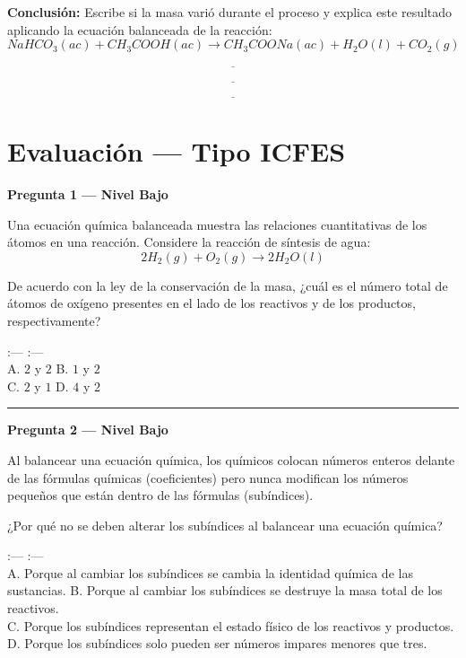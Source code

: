 \documentclass[
  spanish,
  letterpaper,
  12pt,
  oneside,
  open=any]{scrbook}
\newcommand{\setcolorsection}[2]{%
  \definecolor{currentsectionbg}{HTML}{#1}%
  \definecolor{currentsectionborder}{HTML}{#2}%
}
\begin{document}
\textbf{Conclusión:} Escribe si la masa varió durante el proceso y
explica este resultado aplicando la ecuación balanceada de la reacción:
\[NaHCO_3(ac) + CH_3COOH(ac) \rightarrow CH_3COONa(ac) + H_2O(l) + CO_2(g)\]

\[\underline{\hspace{6cm}}\]

\[\underline{\hspace{6cm}}\]

\[\underline{\hspace{6cm}}\]

\setcolorsection{f0c4b8}{dcb0a4}

\section{Evaluación --- Tipo ICFES}\label{evaluaciuxf3n-tipo-icfes-1}

\textbf{Pregunta 1 --- Nivel Bajo}

Una ecuación química balanceada muestra las relaciones cuantitativas de
los átomos en una reacción. Considere la reacción de síntesis de agua:
\[2H_2(g) + O_2(g) \rightarrow 2H_2O(l)\]

De acuerdo con la ley de la conservación de la masa, ¿cuál es el número
total de átomos de oxígeno presentes en el lado de los reactivos y de
los productos, respectivamente?

:--- \textbar{} :--- \textbar{}\\
A. \(2\) y \(2\) \textbar{} B. \(1\) y \(2\) \textbar{}\\
C. \(2\) y \(1\) \textbar{} D. \(4\) y \(2\) \textbar{}

\begin{center}\rule{0.5\linewidth}{0.5pt}\end{center}

\textbf{Pregunta 2 --- Nivel Bajo}

Al balancear una ecuación química, los químicos colocan números enteros
delante de las fórmulas químicas (coeficientes) pero nunca modifican los
números pequeños que están dentro de las fórmulas (subíndices).

¿Por qué no se deben alterar los subíndices al balancear una ecuación
química?

:--- \textbar{} :--- \textbar{}\\
A. Porque al cambiar los subíndices se cambia la identidad química de
las sustancias. \textbar{} B. Porque al cambiar los subíndices se
destruye la masa total de los reactivos. \textbar{}\\
C. Porque los subíndices representan el estado físico de los reactivos y
productos. \textbar{} D. Porque los subíndices solo pueden ser números
impares menores que tres. \textbar{}
\end{document}
